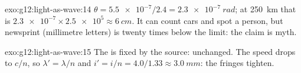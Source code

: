 \begin{solution}{exo:g12:light-as-wave:14}
$\theta = \num{5.5e-7}/2.4 = \qty{2.3e-7}{rad}$; at \qty{250}{km}
that is $\num{2.3e-7} \times \num{2.5e5} \approx \qty{6}{cm}$. It can
count cars and spot a person, but newsprint (millimetre letters) is
twenty times below the  limit: the claim is myth.
\end{solution}

\begin{solution}{exo:g12:light-as-wave:15}
The  is fixed by the source: unchanged. The speed drops to
$c/n$, so $\lambda' = \lambda/n$ and
$i' = i/n = 4.0/1.33 \approx \qty{3.0}{mm}$: the fringes tighten.
\end{solution}

